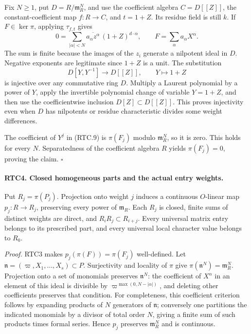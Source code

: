 Fix \(N\geq1\), put \(D=R/\mathfrak m_R^N\), and use the
coefficient algebra \(C=D[[Z]]\), the constant-coefficient map
\(f:R\to C\), and \(t=1+Z\).  Its residue field is still
\(k\).  If \(F\in\ker\pi\), applying \(\tau_{f,t}\) gives
\[
 0=\sum_{|\alpha|<N}
       \overline{a_\alpha z^\alpha}\,(1+Z)^{d\cdot\alpha},
       \qquad F=\sum_\alpha a_\alpha X^\alpha.
                                                        \tag{RTC.9}
\]
The sum is finite because the images of the \(z_i\) generate a
nilpotent ideal in \(D\).  Negative exponents are legitimate since
\(1+Z\) is a unit.  The substitution
\[
 D[Y,Y^{-1}]\longrightarrow D[[Z]],\qquad Y\longmapsto1+Z
                                                        \tag{RTC.10}
\]
is injective over any commutative ring \(D\).  Multiply a Laurent
polynomial by a power of \(Y\), apply the invertible polynomial
change of variable \(Y=1+Z\), and then use the coefficientwise
inclusion \(D[Z]\subset D[[Z]]\).  This proves injectivity even
when \(D\) has nilpotents or residue characteristic divides some
weight differences.

The coefficient of \(Y^j\) in (RTC.9) is
\(\pi(F_j)\) modulo \(\mathfrak m_R^N\), so it is zero.
This holds for every \(N\).  Separatedness of the coefficient
algebra \(R\) yields \(\pi(F_j)=0\), proving the claim.
\hfill\(\square\)

\paragraph{RTC4. Closed homogeneous parts and the actual entry weights.}
\label{claim:RTC4}
Put \(R_j=\pi(P_j)\).  Projection onto weight \(j\) induces a
continuous \(O\)-linear map \(p_j:R\to R_j\), preserving every
power of \(\mathfrak m_R\).  Each \(R_j\) is closed, finite
sums of distinct weights are direct, and
\(R_iR_j\subset R_{i+j}\).  Every universal matrix entry belongs
to its prescribed part, and every universal local character value
belongs to \(R_0\).

\emph{Proof.}
RTC3 makes \(p_j(\pi(F))=\pi(F_j)\) well-defined.  Let
\(\mathfrak n=(\varpi,X_1,\ldots,X_s)\subset P\).
Surjectivity and locality of \(\pi\) give
\(\pi(\mathfrak n^N)=\mathfrak m_R^N\).
Projection onto a set of monomials preserves \(\mathfrak n^N\):
the coefficient of \(X^\alpha\) in an element of this ideal is
divisible by
\(\varpi^{\max(0,N-|\alpha|)}\), and deleting other coefficients
preserves that condition.  For completeness, this coefficient
criterion follows by expanding products of \(N\) generators of
\(\mathfrak n\); conversely one partitions the indicated monomials
by a divisor of total order \(N\), giving a finite sum of such
products times formal series.  Hence \(p_j\) preserves
\(\mathfrak m_R^N\) and is continuous.

